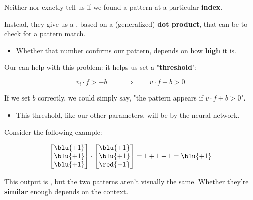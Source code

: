         \begin{clarification}
            Neither  nor  exactly tell us if we found a pattern  at a particular \textbf{index}.

            Instead, they give us a , based on a (generalized) \textbf{dot product}, that can be  to check for a pattern match.

            \begin{itemize}
                \item Whether that number confirms our pattern, depends on how \textbf{high} it is.
            \end{itemize}

            Our  can help with this problem: it helps us set a "\textbf{threshold}":

            \begin{equation*}
                v_i \cdot f > -b 
                \qquad\implies\qquad 
                v \cdot f + b > 0
            \end{equation*}

            If we set $b$ correctly, we could simply say, "the pattern appears if $v \cdot f + b > 0$".

            \begin{itemize}
                \item This threshold, like our other parameters, will be  by the neural network.
            \end{itemize}
        \end{clarification}

        \miniex Consider the following example:

        \begin{equation}
            \begin{bmatrix}
                \blu{+1} \\ \blu{+1} \\ \blu{+1}
            \end{bmatrix}
            \cdot 
            \begin{bmatrix}
                \blu{+1} \\ \blu{+1} \\ \red{-1}
            \end{bmatrix}
            = 
            1+1-1 = \blu{+1}
        \end{equation}

        This output is , but the two patterns aren't visually the same. Whether they're \textbf{similar} enough depends on the context. 

